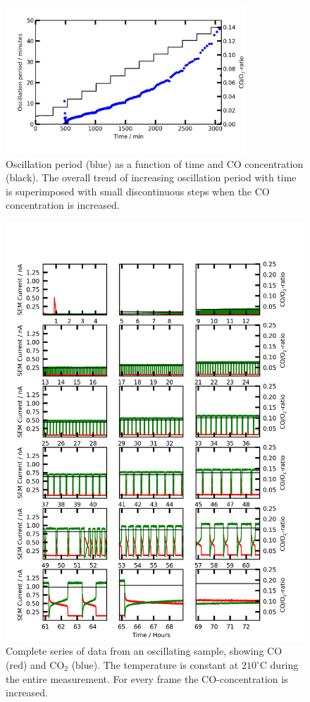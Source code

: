 \documentclass[8.5pt,twoside,twocolumn]{article}
\begin{document}
\begin{figure}[h]
  \centering
  \includegraphics[width=9cm]{oscil_gas_dependence_summary.png}
  \caption{Oscillation period (blue) as a function of time and CO concentration (black). The overall trend of increasing oscillation period with time is superimposed with small discontinuous steps when the CO concentration is increased.}
  \label{fgr:gas_dependence_summary}
\end{figure}

\begin{figure}
  \centering
  \includegraphics[width=14cm]{oscil_gas_dependence.png}
  \caption{Complete series of data from an oscillating sample, showing CO (red) and CO$_2$ (blue). The temperature is constant at $210^\circ$C during the entire measurement. For every frame the CO-concentration is increased.}
  \label{fgr:gas_dependence}
\end{figure}
\end{document}
